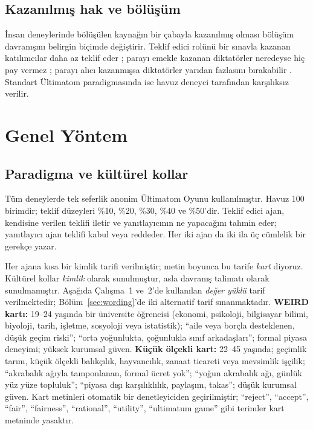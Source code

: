 \documentclass[11pt]{article}
\begin{document}
\subsection{Kazanılmış hak ve bölüşüm}

İnsan deneylerinde bölüşülen kaynağın bir çabayla kazanılmış olması bölüşüm davranışını belirgin biçimde değiştirir. Teklif edici rolünü bir sınavla kazanan katılımcılar daha az teklif eder \citep{hoffman1994}; parayı emekle kazanan diktatörler neredeyse hiç pay vermez \citep{cherry2002}; parayı alıcı kazanmışsa diktatörler yarıdan fazlasını bırakabilir \citep{oxoby2008}. Standart Ültimatom paradigmasında ise havuz deneyci tarafından karşılıksız verilir.


\section{Genel Yöntem}

\subsection{Paradigma ve kültürel kollar}

Tüm deneylerde tek seferlik anonim Ültimatom Oyunu kullanılmıştır. Havuz 100 birimdir; teklif düzeyleri \%10, \%20, \%30, \%40 ve \%50'dir. Teklif edici ajan, kendisine verilen teklifi iletir ve yanıtlayıcının ne yapacağını tahmin eder; yanıtlayıcı ajan teklifi kabul veya reddeder. Her iki ajan da iki ila üç cümlelik bir gerekçe yazar.

Her ajana kısa bir kimlik tarifi verilmiştir; metin boyunca bu tarife \emph{kart} diyoruz. Kültürel kollar \emph{kimlik} olarak sunulmuştur, asla davranış talimatı olarak sunulmamıştır. Aşağıda Çalışma~1 ve~2'de kullanılan \emph{değer yüklü} tarif verilmektedir; Bölüm~\ref{sec:wording}'de iki alternatif tarif sınanmaktadır. \textbf{WEIRD kartı:} 19--24 yaşında bir üniversite öğrencisi (ekonomi, psikoloji, bilgisayar bilimi, biyoloji, tarih, işletme, sosyoloji veya istatistik); ``aile veya borçla desteklenen, düşük geçim riski''; ``orta yoğunlukta, çoğunlukla sınıf arkadaşları''; formal piyasa deneyimi; yüksek kurumsal güven. \textbf{Küçük ölçekli kart:} 22--45 yaşında; geçimlik tarım, küçük ölçekli balıkçılık, hayvancılık, zanaat ticareti veya mevsimlik işçilik; ``akrabalık ağıyla tamponlanan, formal ücret yok''; ``yoğun akrabalık ağı, günlük yüz yüze topluluk''; ``piyasa dışı karşılıklılık, paylaşım, takas''; düşük kurumsal güven. Kart metinleri otomatik bir denetleyiciden geçirilmiştir; ``reject'', ``accept'', ``fair'', ``fairness'', ``rational'', ``utility'', ``ultimatum game'' gibi terimler kart metninde yasaktır.
\end{document}
